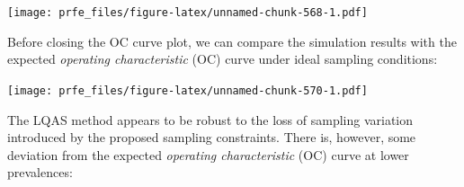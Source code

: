 \documentclass[12pt,a4paper]{book}
\newenvironment{Shaded}{\begin{snugshade}}{\end{snugshade}}
\newcommand{\DataTypeTok}[1]{\textcolor[rgb]{0.13,0.29,0.53}{#1}}
\newcommand{\DecValTok}[1]{\textcolor[rgb]{0.00,0.00,0.81}{#1}}
\newcommand{\FloatTok}[1]{\textcolor[rgb]{0.00,0.00,0.81}{#1}}
\newcommand{\KeywordTok}[1]{\textcolor[rgb]{0.13,0.29,0.53}{\textbf{#1}}}
\newcommand{\NormalTok}[1]{#1}
\newcommand{\OperatorTok}[1]{\textcolor[rgb]{0.81,0.36,0.00}{\textbf{#1}}}
\newcommand{\OtherTok}[1]{\textcolor[rgb]{0.56,0.35,0.01}{#1}}
\newcommand{\StringTok}[1]{\textcolor[rgb]{0.31,0.60,0.02}{#1}}
\theoremstyle{definition}
\theoremstyle{definition}
\theoremstyle{definition}
\theoremstyle{remark}
\begin{document}
\texttt{[image: prfe\_files/figure-latex/unnamed-chunk-568-1.pdf]}

Before closing the OC curve plot, we can compare the simulation results
with the expected \emph{operating characteristic} (OC) curve under ideal
sampling conditions:

\begin{Shaded}
\end{Shaded}

\texttt{[image: prfe\_files/figure-latex/unnamed-chunk-570-1.pdf]}

The LQAS method appears to be robust to the loss of sampling variation
introduced by the proposed sampling constraints. There is, however, some
deviation from the expected \emph{operating characteristic} (OC) curve
at lower prevalences:

\begin{Shaded}
\end{Shaded}
\end{document}
